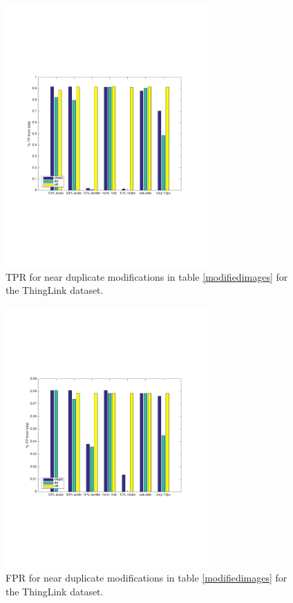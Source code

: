 \documentclass[english,12pt,a4paper,pdftex,elec,utf8]{aaltothesis}
\begin{document}
\clearpage

\begin{figure}[htb]
\begin{center}
\includegraphics[height=10cm]{figures/thinglink_tpBar}
\end{center}
\caption{ TPR for near duplicate modifications in table \ref{modifiedimages} for the ThingLink dataset.}
\label{thinglinktptotal}
\end{figure}

\begin{figure}[htb]
\begin{center}
\includegraphics[height=10cm]{figures/thinglink_fpBar}
\end{center}
\caption{ FPR for near duplicate modifications in table \ref{modifiedimages} for the ThingLink dataset.}
\label{thinglinkfptotal}
\end{figure}
\end{document}
